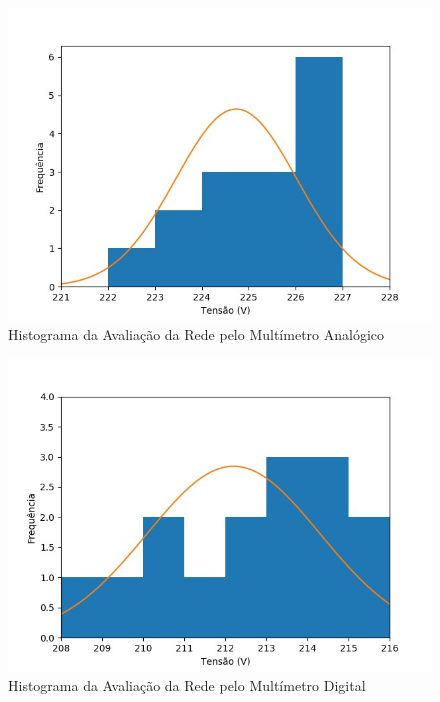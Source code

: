 \documentclass[14pt, oneside]{book}
\theoremstyle{definition}
\begin{document}
                \begin{figure}[H]
                    \centering
                    \includegraphics[scale= 0.5]{2.jpg}
                    \caption{Histograma da Avaliação da Rede pelo Multímetro Analógico}
                    \label{fig:my_labe8}
                \end{figure}
                
                 \begin{figure}[H]
                    \centering
                    \includegraphics[scale= 0.5]{3.jpg}
                    \caption{Histograma da Avaliação da Rede pelo Multímetro Digital}
                    \label{fig:my_labe9}
                \end{figure}
                
\end{document}
